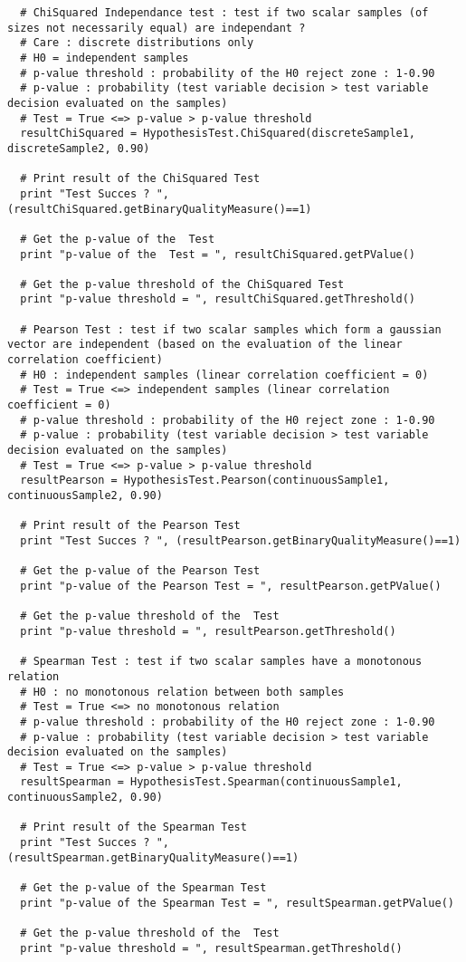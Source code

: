 \begin{lstlisting}
  # ChiSquared Independance test : test if two scalar samples (of sizes not necessarily equal) are independant ?
  # Care : discrete distributions only
  # H0 = independent samples
  # p-value threshold : probability of the H0 reject zone : 1-0.90
  # p-value : probability (test variable decision > test variable decision evaluated on the samples)
  # Test = True <=> p-value > p-value threshold
  resultChiSquared = HypothesisTest.ChiSquared(discreteSample1, discreteSample2, 0.90)

  # Print result of the ChiSquared Test
  print "Test Succes ? ", (resultChiSquared.getBinaryQualityMeasure()==1)

  # Get the p-value of the  Test
  print "p-value of the  Test = ", resultChiSquared.getPValue()

  # Get the p-value threshold of the ChiSquared Test
  print "p-value threshold = ", resultChiSquared.getThreshold()

  # Pearson Test : test if two scalar samples which form a gaussian vector are independent (based on the evaluation of the linear correlation coefficient)
  # H0 : independent samples (linear correlation coefficient = 0)
  # Test = True <=> independent samples (linear correlation coefficient = 0)
  # p-value threshold : probability of the H0 reject zone : 1-0.90
  # p-value : probability (test variable decision > test variable decision evaluated on the samples)
  # Test = True <=> p-value > p-value threshold
  resultPearson = HypothesisTest.Pearson(continuousSample1, continuousSample2, 0.90)

  # Print result of the Pearson Test
  print "Test Succes ? ", (resultPearson.getBinaryQualityMeasure()==1)

  # Get the p-value of the Pearson Test
  print "p-value of the Pearson Test = ", resultPearson.getPValue()

  # Get the p-value threshold of the  Test
  print "p-value threshold = ", resultPearson.getThreshold()

  # Spearman Test : test if two scalar samples have a monotonous relation
  # H0 : no monotonous relation between both samples
  # Test = True <=> no monotonous relation
  # p-value threshold : probability of the H0 reject zone : 1-0.90
  # p-value : probability (test variable decision > test variable decision evaluated on the samples)
  # Test = True <=> p-value > p-value threshold
  resultSpearman = HypothesisTest.Spearman(continuousSample1, continuousSample2, 0.90)

  # Print result of the Spearman Test
  print "Test Succes ? ", (resultSpearman.getBinaryQualityMeasure()==1)

  # Get the p-value of the Spearman Test
  print "p-value of the Spearman Test = ", resultSpearman.getPValue()

  # Get the p-value threshold of the  Test
  print "p-value threshold = ", resultSpearman.getThreshold()
\end{lstlisting}


